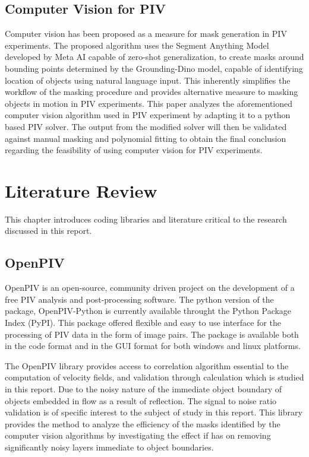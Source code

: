 \documentclass[12pt]{report}
\begin{document}
\section{Computer Vision for PIV}
Computer vision has been proposed as a measure for mask generation in PIV experiments. The proposed algorithm 
uses the Segment Anything Model developed by Meta AI capable of zero-shot generalization, to create masks 
around bounding points determined by the Grounding-Dino model, capable of identifying location of objects 
using natural language input. This inherently simplifies the workflow of the masking procedure and provides 
alternative measure to masking objects in motion in PIV experiments. This paper analyzes the aforementioned computer vision algorithm used in PIV experiment by adapting 
it to a python based PIV solver. The output from the modified solver will then be validated against 
manual masking and polynomial fitting to obtain the final conclusion regarding the feasibility of using 
computer vision for PIV experiments.

\chapter{Literature Review}
This chapter introduces coding libraries and literature critical to the research discussed in this report.
\section{OpenPIV}
OpenPIV is an open-source, community driven project on the development of a free PIV analysis
and post-processing software. The python version of the package, OpenPIV-Python is currently 
available throught the Python Package Index (PyPI). This package offered flexible and easy to use interface
for the processing of PIV data in the form of image pairs. The package is available both in the code format
and in the GUI format for both windows and linux platforms.

The OpenPIV library provides access to correlation algorithm essential to the computation of velocity fields,
and validation through calculation which is studied in this report. Due to the noisy nature of the immediate object
boundary of objects embedded in flow as a result of reflection. The signal to noise ratio validation is of specific interest to 
the subject of study in this report. This library provides the method to analyze the efficiency of the masks identified by the computer vision
algorithms by investigating the effect if has on removing significantly noisy layers immediate to object boundaries. 
\end{document}
